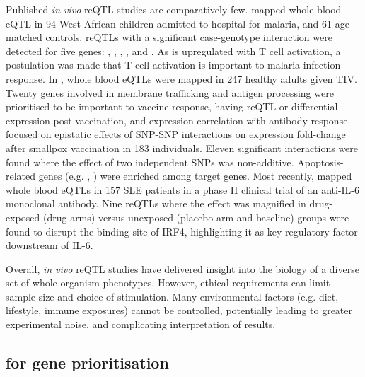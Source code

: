 \begin{outline}
Published \textit{in vivo} \gls{reQTL} studies are comparatively few.
\textcite{idaghdour2012EvidenceAdditiveInteraction} mapped whole blood \gls{eQTL} in 94 West African children admitted to hospital for malaria, and 61 age-matched controls.
\glspl{reQTL} with a significant case-genotype interaction were detected for five genes:
, , , , and .
As  is upregulated with T cell activation, a postulation was made that T cell activation is important to malaria infection response.
In \textcite{franco2013IntegrativeGenomicAnalysis}, whole blood \glspl{eQTL} were mapped in 247 healthy adults given \gls{TIV}.
Twenty genes involved in membrane trafficking and antigen processing were prioritised to be important to vaccine response,
having \gls{reQTL} or differential expression post-vaccination, and expression correlation with antibody response.
\textcite{lareau2016InteractionQuantitativeTrait} focused on epistatic effects of \gls{SNP}-\gls{SNP} interactions on expression fold-change after smallpox vaccination in 183 individuals.
Eleven significant interactions were found where the effect of two independent \glspl{SNP} was non-additive.
Apoptosis-related genes (e.g. , ) were enriched among target genes.
Most recently, \textcite{davenport2018DiscoveringVivoCytokineeQTL}
mapped whole blood \glspl{eQTL} in 157 \gls{SLE} patients in a phase II clinical trial of an anti-IL-6 monoclonal antibody.
Nine \glspl{reQTL} where the effect was magnified in drug-exposed (drug arms) versus unexposed (placebo arm and baseline) groups
were found to disrupt the binding site of IRF4,
highlighting it as key regulatory factor downstream of IL-6.

Overall, \textit{in vivo} \gls{reQTL} studies have delivered insight into the biology of a diverse set of whole-organism phenotypes.
However, ethical requirements can limit sample size and choice of stimulation.
Many environmental factors (e.g. diet, lifestyle, immune exposures) cannot be controlled, 
potentially leading to greater experimental noise, and complicating interpretation of results.

\subsection{ for gene prioritisation}


\end{outline}
